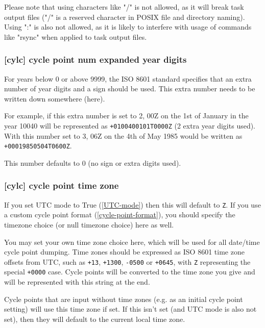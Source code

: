 Please note that using characters like "/" is not allowed, as it will break
task output files ("/" is a reserved character in POSIX file and directory
naming). Using ":" is also not allowed, as it is likely to interfere with
usage of commands like "rsync" when applied to task output files.

\subsubsection[cycle point num expanded year digits]{ [cylc] \textrightarrow
cycle point num expanded year digits}
\label{cycle-point-num-expanded-year-digits}

For years below 0 or above 9999, the ISO 8601 standard specifies that an
extra number of year digits and a sign should be used. This extra number needs
to be written down somewhere (here).

For example, if this extra number is set to 2, 00Z on the 1st of January in
the year 10040 will be represented as \lstinline=+0100400101T0000Z= (2 extra
year digits used). With this number set to 3, 06Z on the 4th of May 1985 would
be written as \lstinline=+00019850504T0600Z=.

This number defaults to 0 (no sign or extra digits used).

\subsubsection[cycle point time zone]{ [cylc] \textrightarrow
cycle point time zone}
\label{cycle-point-time-zone}

If you set UTC mode to True (\ref{UTC-mode}) then this will default to
\lstinline=Z=. If you use a custom cycle point format
(\ref{cycle-point-format}), you should specify the timezone choice (or null
timezone choice) here as well.

You may set your own time zone choice here, which will be used for all
date/time cycle point dumping. Time zones should be expressed as ISO 8601 time
zone offsets from UTC, such as \lstinline=+13=, \lstinline=+1300=,
\lstinline=-0500= or \lstinline=+0645=, with \lstinline=Z= representing the
special \lstinline=+0000= case. Cycle points will be converted to the time
zone you give and will be represented with this string at the end.

Cycle points that are input without time zones (e.g. as an initial cycle point
setting) will use this time zone if set. If this isn't set (and UTC mode is
also not set), then they will default to the current local time zone.

